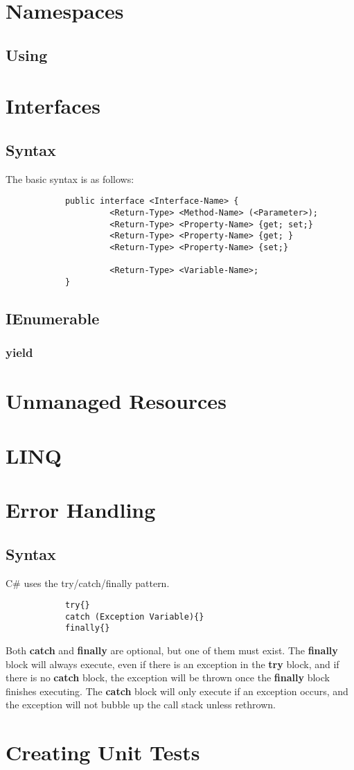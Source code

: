 \documentclass {amsart}
\begin{document}
\section{Namespaces}
	\subsection {Using}
\section{Interfaces}
	\subsection{Syntax} The basic syntax is as follows: 
		\begin{verbatim}
			public interface <Interface-Name> {
				     <Return-Type> <Method-Name> (<Parameter>);
				     <Return-Type> <Property-Name> {get; set;}
				     <Return-Type> <Property-Name> {get; }
				     <Return-Type> <Property-Name> {set;}

				     <Return-Type> <Variable-Name>;
			}
		\end{verbatim}
	\subsection{IEnumerable}
		\subsubsection {yield}

\section{Unmanaged Resources}

\section{LINQ}

\section{Error Handling}
	\subsection{Syntax}  C\# uses the try/catch/finally pattern.
		\begin{lstlisting}
			try{}
			catch (Exception Variable){}
			finally{}
		\end{lstlisting}
	Both {\bf catch} and {\bf finally} are optional, but one of them must exist.  The {\bf finally} block will always execute, even if there is an exception in the {\bf try} block, and if there is no {\bf catch} block, the exception will be thrown once the {\bf finally} block finishes executing.  The {\bf catch} block will only execute if an exception occurs, and the exception will not bubble up the call stack unless rethrown.  
		

\section{Creating Unit Tests}
\end{document}
